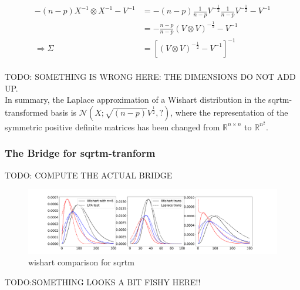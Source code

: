 \begin{align*}
-(n-p) X^{-1} \otimes X^{-1} - V^{-1} &= -(n-p) \frac{1}{n-p}V^{-\frac{1}{2}} \frac{1}{n-p}V^{-\frac{1}{2}} - V^{-1} \\
&= -\frac{n-p}{n-p}(V \otimes V)^{-\frac{1}{2}} -V^{-1}\\
\Rightarrow \Sigma &= [(V \otimes V)^{-\frac{1}{2}} -V^{-1}]^{-1}\\
\end{align*}

TODO: SOMETHING IS WRONG HERE: THE DIMENSIONS DO NOT ADD UP.\\

In summary, the Laplace approximation of a Wishart distribution in the sqrtm-transformed basis is $\mathcal{N}\left(X; \sqrt{(n-p)}V^{\frac{1}{2}},? \right)$, where the representation of the symmetric positive definite matrices has been changed from $\mathbb{R}^{n\times n}$ to $\mathbb{R}^{n^2}$.

\subsubsection{The Bridge for sqrtm-tranform}

TODO: COMPUTE THE ACTUAL BRIDGE

\begin{figure}[!htb]
	\centering
	\includegraphics[width=\textwidth]{figures/wishart_playground_sqrtm.pdf}
	\caption{wishart comparison for sqrtm}
	\label{fig:wishart_comparison}
\end{figure}

TODO:SOMETHING LOOKS A BIT FISHY HERE!!

